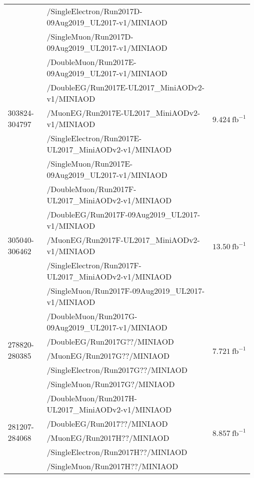 \begin{table}[h]
\begin{tabular}{|l|l|l|}
& /SingleElectron/Run2017D-09Aug2019\_UL2017-v1/MINIAOD &  \\ 
& /SingleMuon/Run2017D-09Aug2019\_UL2017-v1/MINIAOD &  \\ 
\hline
\multirow{5}{*}{303824-304797} & /DoubleMuon/Run2017E-09Aug2019\_UL2017-v1/MINIAOD &  \multirow{5}{*}{$9.424\ \text{fb}^{-1}$} \\ 
& /DoubleEG/Run2017E-UL2017\_MiniAODv2-v1/MINIAOD &  \\ 
& /MuonEG/Run2017E-UL2017\_MiniAODv2-v1/MINIAOD &  \\ 
& /SingleElectron/Run2017E-UL2017\_MiniAODv2-v1/MINIAOD &  \\ 
& /SingleMuon/Run2017E-09Aug2019\_UL2017-v1/MINIAOD &  \\ 
\hline
\multirow{5}{*}{305040-306462} & /DoubleMuon/Run2017F-UL2017\_MiniAODv2-v1/MINIAOD &  \multirow{5}{*}{$13.50\ \text{fb}^{-1}$} \\ 
& /DoubleEG/Run2017F-09Aug2019\_UL2017-v1/MINIAOD &  \\ 
& /MuonEG/Run2017F-UL2017\_MiniAODv2-v1/MINIAOD &  \\ 
& /SingleElectron/Run2017F-UL2017\_MiniAODv2-v1/MINIAOD &  \\ 
& /SingleMuon/Run2017F-09Aug2019\_UL2017-v1/MINIAOD &  \\ 
\hline
\multirow{5}{*}{278820-280385} & /DoubleMuon/Run2017G-09Aug2019\_UL2017-v1/MINIAOD &  \multirow{5}{*}{$7.721\ \text{fb}^{-1}$} \\ 
 & /DoubleEG/Run2017G??/MINIAOD &  \\ 
 & /MuonEG/Run2017G??/MINIAOD &  \\ 
 & /SingleElectron/Run2017G??/MINIAOD &  \\ 
 & /SingleMuon/Run2017G?/MINIAOD &  \\ 
 \hline
 \multirow{5}{*}{281207-284068} & /DoubleMuon/Run2017H-UL2017\_MiniAODv2-v1/MINIAOD &  \multirow{5}{*}{$8.857\ \text{fb}^{-1}$} \\ 
 & /DoubleEG/Run2017??/MINIAOD &  \\ 
 & /MuonEG/Run2017H??/MINIAOD &  \\ 
 & /SingleElectron/Run2017H??/MINIAOD &  \\ 
 & /SingleMuon/Run2017H??/MINIAOD &  \\ 

\end{tabular}
\end{table}
